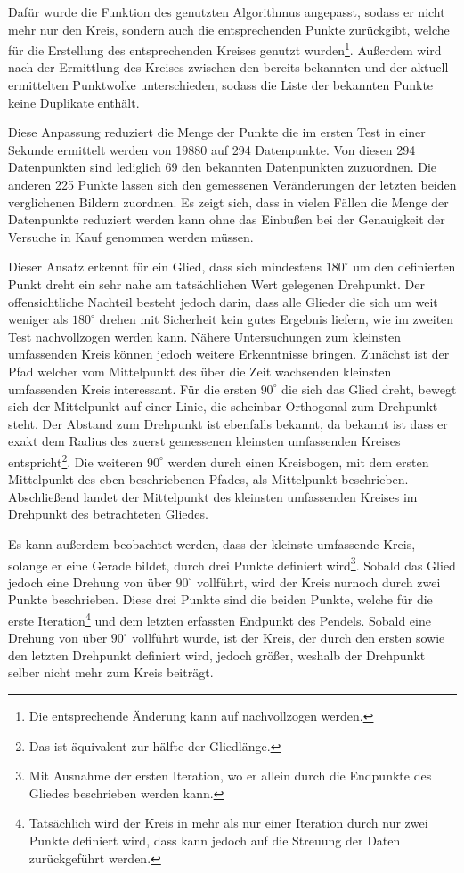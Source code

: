 Dafür wurde die Funktion des genutzten Algorithmus angepasst, sodass er nicht mehr nur den Kreis, sondern auch die entsprechenden Punkte zurückgibt, welche für die Erstellung des entsprechenden Kreises genutzt wurden\footnote{Die entsprechende Änderung kann auf  nachvollzogen werden.}.
Au{\ss}erdem wird nach der Ermittlung des Kreises zwischen den bereits bekannten und der aktuell ermittelten Punktwolke unterschieden, sodass die Liste der bekannten Punkte keine Duplikate enthält.

Diese Anpassung reduziert die Menge der Punkte die im ersten Test in einer Sekunde ermittelt werden von 19880 auf 294 Datenpunkte.
Von diesen 294 Datenpunkten sind lediglich 69 den bekannten Datenpunkten zuzuordnen.
Die anderen 225 Punkte lassen sich den gemessenen Veränderungen der letzten beiden verglichenen Bildern zuordnen.
Es zeigt sich, dass in vielen Fällen die Menge der Datenpunkte reduziert werden kann ohne das Einbu{\ss}en bei der Genauigkeit der Versuche in Kauf genommen werden müssen.

Dieser Ansatz erkennt für ein Glied, dass sich mindestens $180^\circ$ um den definierten Punkt dreht ein sehr nahe am tatsächlichen Wert gelegenen Drehpunkt.
Der offensichtliche Nachteil besteht jedoch darin, dass alle Glieder die sich um weit weniger als $180^\circ$ drehen mit Sicherheit kein gutes Ergebnis liefern, wie im zweiten Test nachvollzogen werden kann.
Nähere Untersuchungen zum kleinsten umfassenden Kreis können jedoch weitere Erkenntnisse bringen.
Zunächst ist der Pfad welcher vom Mittelpunkt des über die Zeit wachsenden kleinsten umfassenden Kreis interessant.
Für die ersten $90^\circ$ die sich das Glied dreht, bewegt sich der Mittelpunkt auf einer Linie, die scheinbar Orthogonal zum Drehpunkt steht.
Der Abstand zum Drehpunkt ist ebenfalls bekannt, da bekannt ist dass er exakt dem Radius des zuerst gemessenen kleinsten umfassenden Kreises entspricht\footnote{Das ist äquivalent zur hälfte der Gliedlänge.}.
Die weiteren $90^\circ$ werden durch einen Kreisbogen, mit dem ersten Mittelpunkt des eben beschriebenen Pfades, als Mittelpunkt beschrieben.
Abschlie{\ss}end landet der Mittelpunkt des kleinsten umfassenden Kreises im Drehpunkt des betrachteten Gliedes.

Es kann au{\ss}erdem beobachtet werden, dass der kleinste umfassende Kreis, solange er eine Gerade bildet, durch drei Punkte definiert wird\footnote{Mit Ausnahme der ersten Iteration, wo er allein durch die Endpunkte des Gliedes beschrieben werden kann.}.
Sobald das Glied jedoch eine Drehung von über $90^\circ$ vollführt, wird der Kreis nurnoch durch zwei Punkte beschrieben.
Diese drei Punkte sind die beiden Punkte, welche für die erste Iteration\footnote{Tatsächlich wird der Kreis in mehr als nur einer Iteration durch nur zwei Punkte definiert wird, dass kann jedoch auf die Streuung der Daten zurückgeführt werden.} und dem letzten erfassten Endpunkt des Pendels.
Sobald eine Drehung von über $90^\circ$ vollführt wurde, ist der Kreis, der durch den ersten sowie den letzten Drehpunkt definiert wird, jedoch grö{\ss}er, weshalb der Drehpunkt selber nicht mehr zum Kreis beiträgt.


